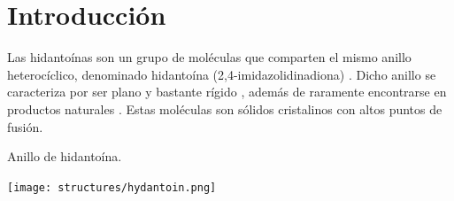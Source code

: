 \documentclass[fleqn,10pt]{SelfArx}
\begin{document}
\flushbottom %

\maketitle %


\thispagestyle{empty} %




\section*{Introducci\'on} %
Las hidantoínas son un grupo de moléculas que comparten el mismo anillo heterocíclico, denominado hidantoína (2,4-imidazolidinadiona) \cite{m2015}\cite{kroschwitz2007}. Dicho anillo se caracteriza por ser plano y bastante rígido \cite{m2015}, además de raramente encontrarse en productos naturales \cite{kroschwitz2007}. Estas moléculas son sólidos cristalinos con altos puntos de fusión.
\begin{scheme}[h]
	\centering
	\caption{Anillo de hidanto\'ina.}
	\texttt{[image: structures/hydantoin.png]}
\end{scheme}
\end{document}
